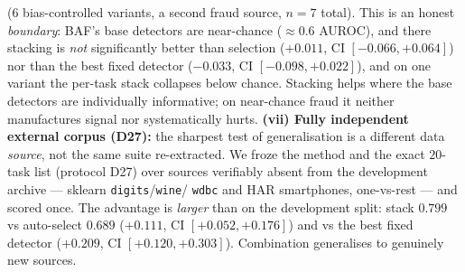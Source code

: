 \documentclass[10pt,conference]{IEEEtran}
\begin{document}
\cite{baf} ($6$ bias-controlled variants, a second fraud source, $n{=}7$ total).
This is an honest \emph{boundary}: BAF's base detectors are near-chance ($\approx\!0.6$
AUROC), and there stacking is \emph{not} significantly better than selection
($+0.011$, CI $[-0.066,+0.064]$) nor than the best fixed detector ($-0.033$, CI
$[-0.098,+0.022]$), and on one variant the per-task stack collapses below chance.
Stacking helps where the base detectors are individually informative; on near-chance
fraud it neither manufactures signal nor systematically hurts.
\textbf{(vii) Fully independent external corpus (D27):} the sharpest test of
generalisation is a different data \emph{source}, not the same suite re-extracted. We
froze the method and the exact $20$-task list (protocol D27) over sources verifiably
absent from the development archive --- sklearn \texttt{digits}/\texttt{wine}/%
\texttt{wdbc} and HAR smartphones, one-vs-rest --- and scored once. The advantage is
\emph{larger} than on the development split: stack $0.799$ vs auto-select $0.689$
($+0.111$, CI $[+0.052,+0.176]$) and vs the best fixed detector ($+0.209$, CI
$[+0.120,+0.303]$). Combination generalises to genuinely new sources.
\end{document}
